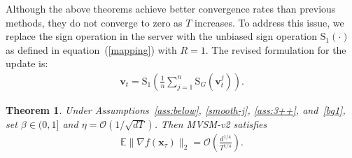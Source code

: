\documentclass[10pt,a4paper]{amsart}
\theoremstyle{plain}
\newtheorem{theorem}{Theorem}
\theoremstyle{definition}
\def \E {\mathbb{E}}
\def \v {\mathbf{v}}
\def \x {\mathbf{x}}
\begin{document}
Although the above theorems achieve better convergence rates than previous methods, they do not converge to zero as $T$ increases. To address this issue, we replace the sign operation in the server with the unbiased sign operation $\operatorname{S_1}(\cdot)$ as defined in equation~(\ref{mapping}) with $R = 1$. The revised formulation for the update is:
\begin{align}\label{modi}
    \v_t = \operatorname{S_1}\left( \frac{1}{n}\sum_{j=1}^n \operatorname{S_\textit{G}}\left({\v}_t^j\right)\right).
\end{align}

\begin{theorem}\label{thm4}
Under Assumptions~\ref{ass:below}, \ref{smooth-j}, \ref{ass:3++}, and~\ref{bg1}, set $\beta\in(0,1]$ and $\eta=\mathcal{O}(1/\sqrt{dT})$. Then MVSM-v2 satisfies
\begin{align*}
 \E\|\nabla f(\x_\tau)\|_2=\mathcal O\left(\frac{d^{1/4}}{T^{1/4}}\right).
\end{align*}
\end{theorem}
\end{document}
